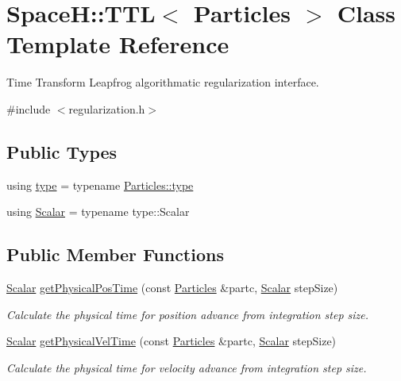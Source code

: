 \hypertarget{class_space_h_1_1_t_t_l}{}\section{SpaceH\+:\+:T\+TL$<$ Particles $>$ Class Template Reference}
\label{class_space_h_1_1_t_t_l}


Time Transform Leapfrog algorithmatic regularization interface.  




{\ttfamily \#include $<$regularization.\+h$>$}

\subsection*{Public Types}
\begin{DoxyCompactItemize}
\item 
using \mbox{\hyperlink{class_space_h_1_1_t_t_l_a51de608711eb738bb6f80447759c15f0}{type}} = typename \mbox{\hyperlink{class_space_h_1_1_vel_indep_particles_a09aa167b5fb1b203ab021220601ed74c}{Particles\+::type}}
\item 
using \mbox{\hyperlink{class_space_h_1_1_t_t_l_a8d0bb489470e6da1bcaf70a9eb38d96d}{Scalar}} = typename type\+::\+Scalar
\end{DoxyCompactItemize}
\subsection*{Public Member Functions}
\begin{DoxyCompactItemize}
\item 
\mbox{\hyperlink{class_space_h_1_1_t_t_l_a8d0bb489470e6da1bcaf70a9eb38d96d}{Scalar}} \mbox{\hyperlink{class_space_h_1_1_t_t_l_a98eae0c137d47ead0c1483521443b5d7}{get\+Physical\+Pos\+Time}} (const \mbox{\hyperlink{struct_space_h_1_1_particles}{Particles}} \&partc, \mbox{\hyperlink{class_space_h_1_1_t_t_l_a8d0bb489470e6da1bcaf70a9eb38d96d}{Scalar}} step\+Size)
\begin{DoxyCompactList}\small\item\em Calculate the physical time for position advance from integration step size. \end{DoxyCompactList}\item 
\mbox{\hyperlink{class_space_h_1_1_t_t_l_a8d0bb489470e6da1bcaf70a9eb38d96d}{Scalar}} \mbox{\hyperlink{class_space_h_1_1_t_t_l_aa98edc3ecfab76e612b9e77f64c08865}{get\+Physical\+Vel\+Time}} (const \mbox{\hyperlink{struct_space_h_1_1_particles}{Particles}} \&partc, \mbox{\hyperlink{class_space_h_1_1_t_t_l_a8d0bb489470e6da1bcaf70a9eb38d96d}{Scalar}} step\+Size)
\begin{DoxyCompactList}\small\item\em Calculate the physical time for velocity advance from integration step size. \end{DoxyCompactList}\end{DoxyCompactItemize}


